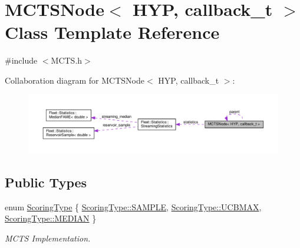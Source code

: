 \hypertarget{class_m_c_t_s_node}{}\section{M\+C\+T\+S\+Node$<$ H\+YP, callback\+\_\+t $>$ Class Template Reference}
\label{class_m_c_t_s_node}


{\ttfamily \#include $<$M\+C\+T\+S.\+h$>$}



Collaboration diagram for M\+C\+T\+S\+Node$<$ H\+YP, callback\+\_\+t $>$\+:\nopagebreak
\begin{figure}[H]
\begin{center}
\leavevmode
\includegraphics[width=350pt]{class_m_c_t_s_node__coll__graph}
\end{center}
\end{figure}
\subsection*{Public Types}
\begin{DoxyCompactItemize}
\item 
enum \hyperlink{class_m_c_t_s_node_a5a201dc80c97c1b65503161f7e5603f6}{Scoring\+Type} \{ \hyperlink{class_m_c_t_s_node_a5a201dc80c97c1b65503161f7e5603f6af5a2496cf66cb8cffe66cb1b27d7dede}{Scoring\+Type\+::\+S\+A\+M\+P\+LE}, 
\hyperlink{class_m_c_t_s_node_a5a201dc80c97c1b65503161f7e5603f6a16e3acc5a0f586b6e37536492dfbc47f}{Scoring\+Type\+::\+U\+C\+B\+M\+AX}, 
\hyperlink{class_m_c_t_s_node_a5a201dc80c97c1b65503161f7e5603f6a8ab0c3a037e882577dec378985477074}{Scoring\+Type\+::\+M\+E\+D\+I\+AN}
 \}\begin{DoxyCompactList}\small\item\em M\+C\+TS Implementation. \end{DoxyCompactList}
\end{DoxyCompactItemize}
